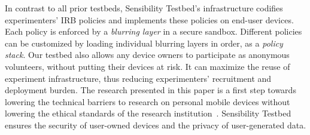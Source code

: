 In contrast to all prior testbeds, Sensibility Testbed's
infrastructure codifies experimenters' IRB policies and 
implements these policies on end-user devices. Each 
policy is enforced by a \textit{blurring layer} in a secure 
sandbox. Different policies can be customized by loading
individual blurring layers in order, as a \textit{policy stack}. Our testbed also allows
any device owners to participate as anonymous volunteers,
without putting their devices at risk. It can 
maximize the reuse of experiment infrastructure, thus reducing 
experimenters' recruitment and deployment burden. 
%
%
%
%
%					
The research presented in this paper is a first step towards lowering the technical
barriers to research on personal mobile devices without lowering the
ethical standards of the research institution~\cite{zevenbergen2013ethical}. 
Sensibility Testbed ensures the security of user-owned devices and the 
privacy of user-generated data.  
%
